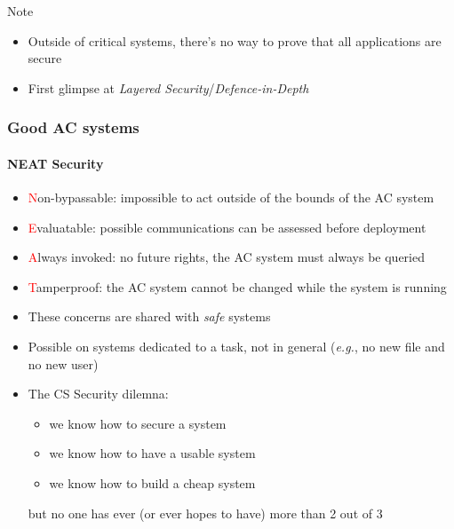 \begin{reveals}
\begin{frame}
  \vfill

  \begin{block}{Note}
    \begin{itemize}
    \item Outside of critical systems, there's no way to prove that
      all applications are secure
    \item First glimpse at \emph{Layered Security}/\emph{Defence-in-Depth}
    \end{itemize}
  \end{block}
\end{frame}




\begin{frame}
  \frametitle{Good AC systems}
  \framesubtitle{NEAT Security}

  \begin{itemize}[<+->]
  \item \textcolor{red}{N}on-bypassable: impossible to act outside of
    the bounds of the AC system
  \item \textcolor{red}{E}valuatable: possible communications can be
    assessed before deployment
  \item \textcolor{red}{A}lways invoked: no future rights, the AC
    system must always be queried
  \item \textcolor{red}{T}amperproof: the AC system cannot be changed
    while the system is running
  \end{itemize}
  
  \pause

  \begin{itemize}
  \item These concerns are shared with \emph{safe} systems
  \item Possible on systems dedicated to a task, not in general
    (\textit{e.g.}, no new file and no new user)
  \item The CS Security dilemna:
    \begin{itemize}
    \item we know how to secure a system
    \item we know how to have a usable system
    \item we know how to build a cheap system
    \end{itemize}
    but no one has ever (or ever hopes to have) more than 2 out of 3
  \end{itemize}

\end{frame}




\end{reveals}

